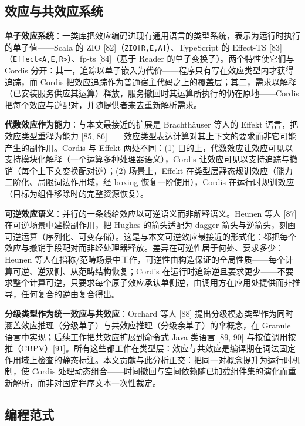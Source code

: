 \documentclass[11pt,a4paper]{article}
\theoremstyle{plain}
\theoremstyle{definition}
\theoremstyle{remark}
\begin{document}
\subsection{效应与共效应系统}

\textbf{单子效应系统}：一类库把效应编码进现有通用语言的类型系统，表示为运行时执行的单子值——Scala 的 ZIO [82]（\texttt{ZIO[R,E,A]}）、TypeScript 的 Effect-TS [83]（\texttt{Effect<A,E,R>}）、fp-ts [84]（基于 Reader 的单子变换子）。两个特性使它们与 Cordis 分开：其一，追踪以单子嵌入为代价——程序只有写在效应类型内才获得追踪，而 Cordis 把效应追踪作为普通宿主代码之上的覆盖层；其二，需求以解释（已安装服务供应其运算）释放，服务撤回时其运算所执行的仍在原地——Cordis 把每个效应与逆配对，并随提供者来去重新解析需求。

\textbf{代数效应作为能力}：与本文最接近的扩展是 Brachthäuser 等人的 Effekt 语言，把效应类型重释为能力 [85, 86]——效应类型表达计算对其上下文的要求而非它可能产生的副作用。Cordis 与 Effekt 两处不同：(1) 目的上，代数效应让效应可见以支持模块化解释（一个运算多种处理器语义），Cordis 让效应可见以支持追踪与撤销（每个上下文变换配对逆）；(2) 场景上，Effekt 在类型层静态规训效应（能力二阶化、局限词法作用域，经 boxing 恢复一阶使用），Cordis 在运行时规训效应（目标为组件移除时的完整资源恢复）。

\textbf{可逆效应语义}：并行的一条线给效应以可逆语义而非解释语义。Heunen 等人 [87] 在可逆场景中建模副作用，把 Hughes 的箭头适配为 dagger 箭头与逆箭头，刻画可逆运算（序列化、可变存储）。这是与本文可逆效应最接近的形式化：都把每个效应与撤销手段配对而非经处理器释放。差异在可逆性居于何处、要求多少：Heunen 等人在指称/范畴场景中工作，可逆性由构造保证的全局性质——每个计算可逆、逆双侧、从范畴结构恢复；Cordis 在运行时追踪逆且要求更少——不要求整个计算可逆，只要求每个原子效应承认单侧逆，由调用方在应用处提供而非推导，任何复合的逆由复合得出。

\textbf{分级类型作为统一效应与共效应}：Orchard 等人 [88] 提出分级模态类型作为同时涵盖效应推理（分级单子）与共效应推理（分级余单子）的伞概念，在 Granule 语言中实现；后续工作把共效应扩展到命令式 Java 类语言 [89, 90] 与按值调用按推（CBPV）[91]。所有这些都工作在类型层：效应与共效应是编译期在词法固定作用域上检查的静态标注。本文贡献与此分析正交：把同一对概念提升为运行时机制，使 Cordis 处理动态组合——时间撤回与空间依赖随已加载组件集的演化而重新解析，而非对固定程序文本一次性裁定。

\subsection{编程范式}
\end{document}
